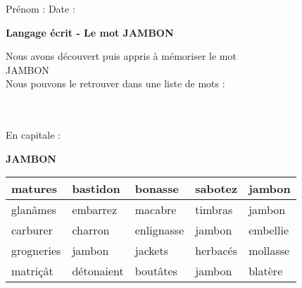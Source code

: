 \documentclass[a4paper, 11pt,oneside, fleqn]{article}
\begin{document}
\newcommand{\x}{\times}
\renewcommand{\arraystretch}{1.5}

\sloppy
\pagestyle{empty}
\begin{onehalfspace}


\sffamily \noindent \Large Pr\'enom : \fbox{\begin{minipage}{9cm} \vspace{1.2cm}\hspace{9cm} \end{minipage}} \hspace{1.5cm}\Large Date :\vspace{2mm}\\
\begin{minipage}{12cm}
\begin{center}
\Large\textbf{Langage \'ecrit - Le mot \MakeUppercase{jambon}}
\end{center}
\normalsize Nous avons d\'ecouvert puis appris \`a m\'emoriser le mot\\
\MakeUppercase{jambon}\\
Nous pouvons le retrouver dans une liste de mots : \end{minipage}\\
\vspace{0.25cm}\\
 
\large\noindent En capitale :
\begin{center}
{\huge \textbf{\MakeUppercase{jambon}}}
\vspace{0.25cm}\\
\begin{tabulary}{17cm}{|g|g|g|g|g|}
\hline
matures & bastidon & bonasse & sabotez & jambon \\
\hline
glanâmes & embarrez & macabre & timbras & jambon \\
\hline
carburer & charron & enlignasse & jambon & embellie \\
\hline
grogneries & jambon & jackets & herbacés & mollasse \\
\hline
matriçât & détonaient & boutâtes & jambon & blatère \\
\hline
\end{tabulary}
\end{center}
\vspace{0.5cm}


\end{onehalfspace}
\end{document}
